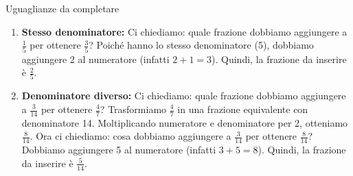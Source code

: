\begin{esercizio}{Uguaglianze da completare}
\begin{soluzione}
\begin{enumerate}[label=\alph*)]
    \item \textbf{Stesso denominatore:}
      Ci chiediamo: quale frazione dobbiamo aggiungere a $\frac{1}{5}$ per ottenere $\frac{3}{5}$?
      Poiché hanno lo stesso denominatore (5), dobbiamo aggiungere 2 al numeratore (infatti $2 + 1 = 3$).
      Quindi, la frazione da inserire è $\frac{2}{5}$.
      
    \item \textbf{Denominatore diverso:}
      Ci chiediamo: quale frazione dobbiamo aggiungere a $\frac{3}{14}$ per ottenere $\frac{4}{7}$?
      Trasformiamo $\frac{4}{7}$ in una frazione equivalente con denominatore 14. Moltiplicando numeratore e denominatore per 2, otteniamo $\frac{8}{14}$.
      Ora ci chiediamo: cosa dobbiamo aggiungere a $\frac{3}{14}$ per ottenere $\frac{8}{14}$?
      Dobbiamo aggiungere 5 al numeratore (infatti $3 + 5 = 8$).
      Quindi, la frazione da inserire è $\frac{5}{14}$.
  \end{enumerate}
\end{soluzione}
\end{esercizio}


